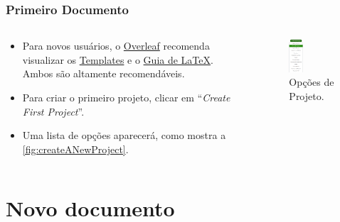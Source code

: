 \documentclass{beamer}
\begin{document}
    \begin{frame}
        \frametitle{Primeiro Documento}
    \begin{columns}
        \begin{column}{0.5\textwidth}
            \begin{itemize}
                \item Para novos usuários, o \href{https://www.overleaf.com/}{Overleaf} recomenda visualizar os \href{https://www.overleaf.com/latex/templates}{Templates} e o \href{https://www.overleaf.com/learn}{Guia de \LaTeX}. Ambos são altamente recomendáveis. 
                \item Para criar o primeiro projeto, clicar em ``\textit{Create First Project}''.
                \item Uma lista de opções aparecerá, como mostra a \autoref{fig:createANewProject}.
            \end{itemize} 
        \end{column}
        \begin{column}{0.5\textwidth}
            \begin{figure}
                \centering
                \caption{Opções de Projeto.}
                \label{fig:createANewProject}
                \includegraphics[width=0.3\textwidth]{../images/createANewProject.png}
            \end{figure}
        \end{column}
    \end{columns}  
    \end{frame}

    \section{Novo documento}
\end{document}
